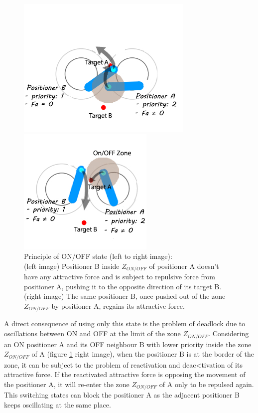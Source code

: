 \documentclass[]{spie}  %
\begin{document}
	\begin{figure}[H]
		\centering
		\begin{minipage}[t]{6.5cm}
			\includegraphics[scale=0.9]{images/first_state_0.jpg}
		\end{minipage}
		\begin{minipage}[t]{5cm}
			\includegraphics[scale=0.9]{images/first_state_ONOFF2.jpg}
		\end{minipage}
		\caption{\centering Principle of ON/OFF state (left to right image): \\
			(left image) Positioner B inside  $Z_{ON/OFF}$ of positioner A doesn't have any attractive force and is subject to repulsive force from positioner A, pushing it to the opposite direction of its target B. (right image) The same positioner B, once pushed out of the zone $Z_{ON/OFF}$  by positioner A, regains its attractive force.\\
\label{key}			}
		\label{First_state}
	\end{figure}
	
	A direct consequence of using only this state is the problem of deadlock due to oscillations between ON and OFF at the limit of the zone $Z_{ON/OFF}$. Considering an ON positioner A and its OFF neighbour B with lower priority inside the zone $Z_{ON/OFF}$ of A (figure \ref{First_state} right image), when the positioner B is at the border of the zone, it can be subject to the problem of reactivation and deac<tivation of its attractive force. If the reactivated attractive force is opposing the movement of the positioner A, it will re-enter the zone $Z_{ON/OFF}$ of A only to be repulsed again. This switching states can block the positioner A as the adjacent positioner B keeps oscillating at the same place.\\
	
\end{document}
